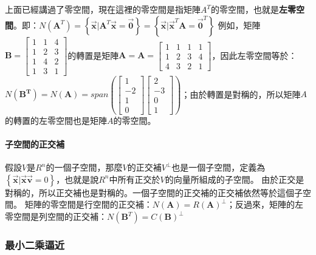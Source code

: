 \documentclass[11pt]{article}
\begin{document}
{上面已經講過了零空間，現在這裡的零空間是指矩陣\(A^T\)的零空間，也就是\textbf{左零空間}。即：\(N(\mathbf{A}^T) = \left\{ \vec{\mathbf{x}} | \mathbf{A}^{T} \vec{\mathbf{x}} = \vec{\mathbf{0}} \right\} = \left\{ \vec{\mathbf{x}} | \vec{\mathbf{x}}^{T} \mathbf{A} = \vec{\mathbf{0}}^{T} \right\}\)
例如，矩陣\(\mathbf{B} = \begin{bmatrix}1 & 1 & 4 \\ 1 & 2 & 3 \\1 & 4 & 2\\ 1 & 3 & 1\end{bmatrix}\)的轉置是矩陣\(\mathbf{A} = \mathbf{A} = \begin{bmatrix}1 & 1 & 1 & 1 \\ 1 & 2 & 3 & 4 \\4 & 3 & 2 & 1\end{bmatrix}\)，因此左零空間等於：\(N(\mathbf{B^T}) = N(\mathbf{A}) = span\left(\begin{bmatrix} 1 \\ -2 \\ 1 \\ 0 \end{bmatrix} \begin{bmatrix} 2 \\ -3 \\ 0 \\ 1 \end{bmatrix}\right)\)；由於轉置是對稱的，所以矩陣\(A\)的轉置的左零空間也是矩陣\(A\)的零空間。

    \hypertarget{ux5b50ux7a7aux9593ux7684ux6b63ux4ea4ux88dc}{%
\paragraph{子空間的正交補}\label{ux5b50ux7a7aux9593ux7684ux6b63ux4ea4ux88dc}}

假設\(V\)是\(R^n\)的一個子空間，那麼\(V\)的正交補\(V^\perp\)也是一個子空間，定義為\(\left\{\vec{\mathbf{x}} | \vec{\mathbf{x}} \vec{\mathbf{v}}=0\right\}\)，也就是說\(R^n\)中所有正交於\(V\)的向量所組成的子空間。
由於正交是對稱的，所以正交補也是對稱的。一個子空間的正交補的正交補依然等於這個子空間。
矩陣的零空間是行空間的正交補：\(N(\mathbf{A}) = R(\mathbf{A})^{\bot}\)；反過來，矩陣的左零空間是列空間的正交補：\(N(\mathbf{B}^T) = C(\mathbf{B})^{\bot}\)

    \hypertarget{ux6700ux5c0fux4e8cux4e58ux903cux8fd1}{%
\subsubsection{最小二乘逼近}\label{ux6700ux5c0fux4e8cux4e58ux903cux8fd1}}

}
\end{document}
